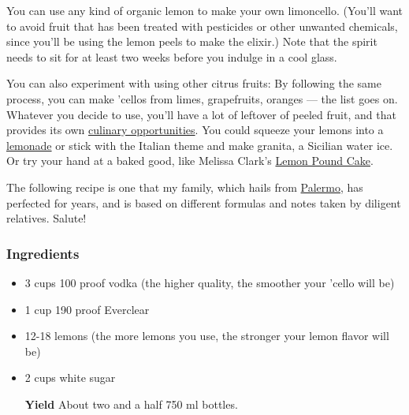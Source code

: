 You can use any kind of organic lemon to make your own limoncello.
(You'll want to avoid fruit that has been treated with pesticides or
other unwanted chemicals, since you'll be using the lemon peels to make
the elixir.) Note that the spirit needs to sit for at least two weeks
before you indulge in a cool glass.

You can also experiment with using other citrus fruits: By following the
same process, you can make 'cellos from limes, grapefruits, oranges ---
the list goes on. Whatever you decide to use, you'll have a lot of
leftover of peeled fruit, and that provides its own
\href{https://cooking.nytimes3xbfgragh.onion/68861692-nyt-cooking/10757465-our-20-best-lemon-desserts}{culinary
opportunities}. You could squeeze your lemons into a
\href{https://cooking.nytimes3xbfgragh.onion/recipes/8703-sweet-or-salty-lemonade}{lemonade}
or stick with the Italian theme and make granita, a Sicilian water ice.
Or try your hand at a baked good, like Melissa Clark's
\href{https://cooking.nytimes3xbfgragh.onion/recipes/1014800-lemon-poppy-seed-pound-cake?action=click\&module=Collection\%20Page\%20Recipe\%20Card\&region=16\%20of\%20Our\%20Most\%20Popular\%20Lemon\%20Desserts\&pgType=collection\&rank=11}{Lemon
Pound Cake}.

The following recipe is one that my family, which hails from
\href{https://www.nytimes3xbfgragh.onion/interactive/2015/12/18/travel/what-to-do-in-36-hours-in-palermo-sicily.html}{Palermo},
has perfected for years, and is based on different formulas and notes
taken by diligent relatives. Salute!

\hypertarget{ingredients}{%
\subsubsection{\texorpdfstring{\textbf{Ingredients}}{Ingredients}}\label{ingredients}}

\begin{itemize}
\item
  3 cups 100 proof vodka (the higher quality, the smoother your 'cello
  will be)
\item
  1 cup 190 proof Everclear
\item
  12-18 lemons (the more lemons you use, the stronger your lemon flavor
  will be)
\item
  2 cups white sugar

  \textbf{Yield} About two and a half 750 ml bottles.
\end{itemize}

